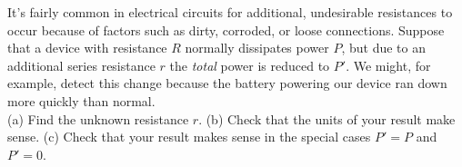 It's fairly common in electrical circuits for additional, undesirable resistances to occur
because of factors such as dirty, corroded, or loose connections. Suppose that a device
with resistance $R$ normally dissipates power $P$, but due to an additional series resistance $r$
the \emph{total} power is reduced to $P'$. We might, for example, detect this change because
the battery powering our device ran down more quickly than normal. \\
(a) Find the unknown resistance $r$.\answercheck\hwendpart
(b) Check that the units of your result make sense.\hwendpart
(c) Check that your result makes sense in the special cases $P'=P$ and $P'=0$.
